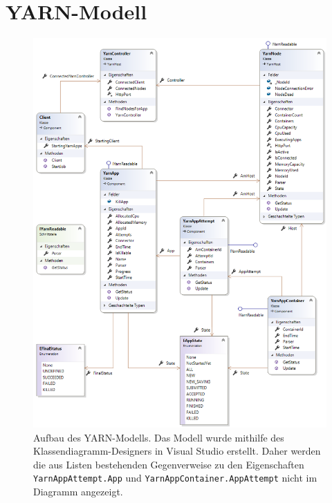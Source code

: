 \section{YARN-Modell}\label{sec:yarnModel}

\begin{figure}
	\centering
	\includegraphics[width=\columnwidth]{./images/yarnModel.png}
	\caption[Aufbau des YARN-Modells]{Aufbau des YARN-Modells. Das Modell wurde mithilfe des Klassendiagramm-Designers in Visual Studio erstellt. Daher werden die aus Listen bestehenden Gegenverweise zu den Eigenschaften \texttt{YarnAppAttempt.App} und \texttt{YarnAppContainer.AppAttempt} nicht im Diagramm angezeigt.}
	\label{fig:yarnModel}
\end{figure}